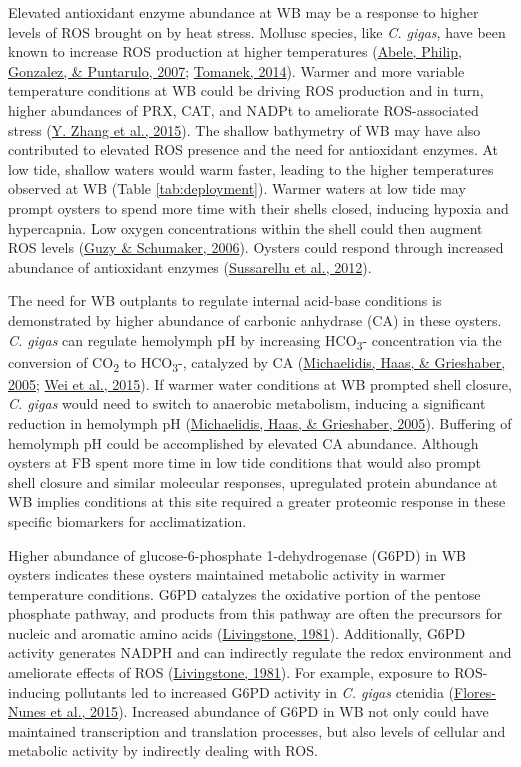 \documentclass [11pt, proquest] {uwthesis}[2015/03/03]
\begin{document}
Elevated antioxidant enzyme abundance at WB may be a response to higher levels of ROS brought on by heat stress. Mollusc species, like \emph{C. gigas}, have been known to increase ROS production at higher temperatures (\protect\hyperlink{ref-Abele2007}{Abele, Philip, Gonzalez, \& Puntarulo, 2007}; \protect\hyperlink{ref-Tomanek2014}{Tomanek, 2014}). Warmer and more variable temperature conditions at WB could be driving ROS production and in turn, higher abundances of PRX, CAT, and NADPt to ameliorate ROS-associated stress (\protect\hyperlink{ref-Zhang2015}{Y. Zhang et al., 2015}). The shallow bathymetry of WB may have also contributed to elevated ROS presence and the need for antioxidant enzymes. At low tide, shallow waters would warm faster, leading to the higher temperatures observed at WB (Table \ref{tab:deployment}). Warmer waters at low tide may prompt oysters to spend more time with their shells closed, inducing hypoxia and hypercapnia. Low oxygen concentrations within the shell could then augment ROS levels (\protect\hyperlink{ref-Guzy2006}{Guzy \& Schumaker, 2006}). Oysters could respond through increased abundance of antioxidant enzymes (\protect\hyperlink{ref-Sussarellu2012}{Sussarellu et al., 2012}).

The need for WB outplants to regulate internal acid-base conditions is demonstrated by higher abundance of carbonic anhydrase (CA) in these oysters. \emph{C. gigas} can regulate hemolymph pH by increasing HCO\textsubscript{3}- concentration via the conversion of CO\textsubscript{2} to HCO\textsubscript{3}-, catalyzed by CA (\protect\hyperlink{ref-Michaelidis2005}{Michaelidis, Haas, \& Grieshaber, 2005}; \protect\hyperlink{ref-Wei2015}{Wei et al., 2015}). If warmer water conditions at WB prompted shell closure, \emph{C. gigas} would need to switch to anaerobic metabolism, inducing a significant reduction in hemolymph pH (\protect\hyperlink{ref-Michaelidis2005}{Michaelidis, Haas, \& Grieshaber, 2005}). Buffering of hemolymph pH could be accomplished by elevated CA abundance. Although oysters at FB spent more time in low tide conditions that would also prompt shell closure and similar molecular responses, upregulated protein abundance at WB implies conditions at this site required a greater proteomic response in these specific biomarkers for acclimatization.

Higher abundance of glucose-6-phosphate 1-dehydrogenase (G6PD) in WB oysters indicates these oysters maintained metabolic activity in warmer temperature conditions. G6PD catalyzes the oxidative portion of the pentose phosphate pathway, and products from this pathway are often the precursors for nucleic and aromatic amino acids (\protect\hyperlink{ref-Livingstone1981}{Livingstone, 1981}). Additionally, G6PD activity generates NADPH and can indirectly regulate the redox environment and ameliorate effects of ROS (\protect\hyperlink{ref-Livingstone1981}{Livingstone, 1981}). For example, exposure to ROS-inducing pollutants led to increased G6PD activity in \emph{C. gigas} ctenidia (\protect\hyperlink{ref-Flores-Nunes2015}{Flores-Nunes et al., 2015}). Increased abundance of G6PD in WB not only could have maintained transcription and translation processes, but also levels of cellular and metabolic activity by indirectly dealing with ROS.
\end{document}
